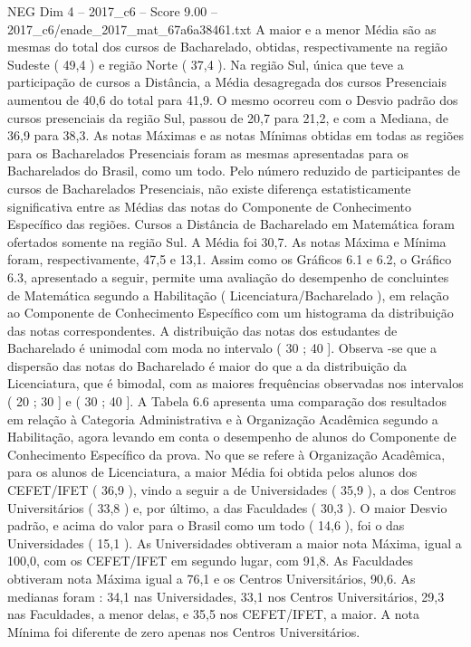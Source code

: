 \begin{textsample}{NEG Dim 4 – 2017\_c6 – Score 9.00 – 2017\_c6/enade\_2017\_mat\_67a6a38461.txt}
A maior e a menor Média são as mesmas do total dos cursos de Bacharelado, obtidas, respectivamente na região Sudeste ( 49,4 ) e região Norte ( 37,4 ).
Na região Sul, única que teve a participação de cursos a Distância, a Média desagregada dos cursos Presenciais aumentou de 40,6 do total para 41,9.
O mesmo ocorreu com o Desvio padrão dos cursos presenciais da região Sul, passou de 20,7 para 21,2, e com a Mediana, de 36,9 para 38,3.
As notas Máximas e as notas Mínimas obtidas em todas as regiões para os Bacharelados Presenciais foram as mesmas apresentadas para os Bacharelados do Brasil, como um todo.
Pelo número reduzido de participantes de cursos de Bacharelados Presenciais, não existe diferença estatisticamente significativa entre as Médias das notas do Componente de Conhecimento Específico das regiões.
Cursos a Distância de Bacharelado em Matemática foram ofertados somente na região Sul.
A Média foi 30,7.
As notas Máxima e Mínima foram, respectivamente, 47,5 e 13,1.
Assim como os Gráficos 6.1 e 6.2, o Gráfico 6.3, apresentado a seguir, permite uma avaliação do desempenho de concluintes de Matemática segundo a Habilitação ( Licenciatura/Bacharelado ), em relação ao Componente de Conhecimento Específico com um histograma da distribuição das notas correspondentes.
A distribuição das notas dos estudantes de Bacharelado é unimodal com moda no intervalo ( 30 ; 40 ].
Observa -se que a dispersão das notas do Bacharelado é maior do que a da distribuição da Licenciatura, que é bimodal, com as maiores frequências observadas nos intervalos ( 20 ; 30 ] e ( 30 ; 40 ].
A Tabela 6.6 apresenta uma comparação dos resultados em relação à Categoria Administrativa e à Organização Acadêmica segundo a Habilitação, agora levando em conta o desempenho de alunos do Componente de Conhecimento Específico da prova.
No que se refere à Organização Acadêmica, para os alunos de Licenciatura, a maior Média foi obtida pelos alunos dos CEFET/IFET ( 36,9 ), vindo a seguir a de Universidades ( 35,9 ), a dos Centros Universitários ( 33,8 ) e, por último, a das Faculdades ( 30,3 ).
O maior Desvio padrão, e acima do valor para o Brasil como um todo ( 14,6 ), foi o das Universidades ( 15,1 ).
As Universidades obtiveram a maior nota Máxima, igual a 100,0, com os CEFET/IFET em segundo lugar, com 91,8.
As Faculdades obtiveram nota Máxima igual a 76,1 e os Centros Universitários, 90,6.
As medianas foram : 34,1 nas Universidades, 33,1 nos Centros Universitários, 29,3 nas Faculdades, a menor delas, e 35,5 nos CEFET/IFET, a maior.
A nota Mínima foi diferente de zero apenas nos Centros Universitários.

\end{textsample}
